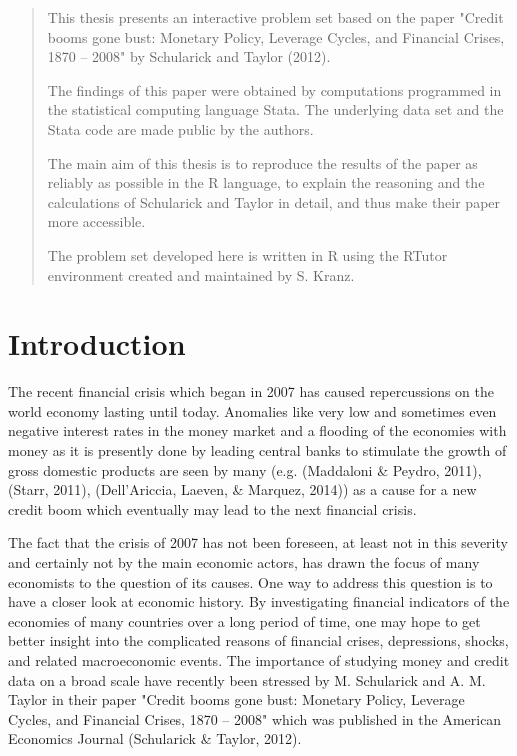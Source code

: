 \documentclass[a4paper,11pt,abstract=on]{scrartcl}
\begin{document}
\begin{abstract}
\setlength{\parskip}{6pt plus 2pt minus 1pt}
\setlength{\parindent}{0pt}
\noindent
This thesis presents an interactive problem set based on the paper
"Credit booms gone bust: Monetary Policy, Leverage Cycles, and Financial Crises, 1870 -- 2008" by Schularick and Taylor (2012). 

The findings of this paper were obtained by computations programmed
in the statistical computing language Stata. The underlying data set
and the Stata code are made public by the authors.

The main aim of this thesis is to reproduce the results of the
paper as reliably as possible in the R language, to explain the
reasoning and the calculations of Schularick and Taylor in detail,
and thus make their paper more accessible.

The problem set developed here is written in R using the RTutor
environment created and maintained by S. Kranz.
\eject
\end{abstract}

{
\linespread{1.5}
\hypersetup{linkcolor=black}
\setcounter{tocdepth}{3}
\tableofcontents
}

\eject

\section{Introduction}
\setlength{\parskip}{6pt plus 2pt minus 1pt}
The recent financial crisis which began in 2007  has caused repercussions on the world economy lasting until today. Anomalies like very low and sometimes even negative interest rates in the money market and a flooding of the economies with money as it is presently done by leading central banks to stimulate the growth of gross domestic products are seen by many (e.g. (Maddaloni \& Peydro, 2011), (Starr, 2011), (Dell'Ariccia, Laeven, \& Marquez, 2014)) as a cause for a new credit boom which eventually may lead to the next financial crisis.

The fact that the crisis of 2007 has not been foreseen, at least not in this severity and certainly not by the main economic actors, has drawn the focus of many economists to the question of its causes. One way to address this question is to have a closer look at economic history.
By investigating financial indicators of the economies of many countries over a long period of time, one may hope to get better insight into the complicated reasons of financial crises, depressions, shocks, and related macroeconomic events. The importance of studying money and credit data on a broad scale have recently been stressed by M. Schularick and A. M. Taylor in their paper "Credit booms gone bust: Monetary Policy, Leverage Cycles, and Financial Crises, 1870 -- 2008" which was published in the American Economics Journal (Schularick \& Taylor, 2012).
\end{document}
